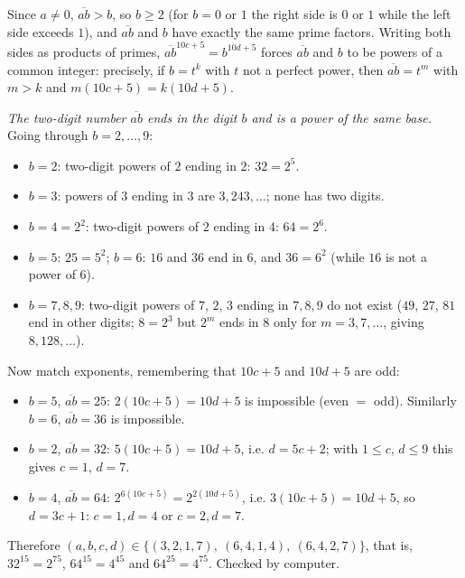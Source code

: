 Since $a\ne0$, $\overline{ab}>b$, so $b\ge2$ (for $b=0$ or $1$ the right side is $0$ or $1$ while the left side exceeds $1$), and $\overline{ab}$ and $b$ have exactly the same prime factors. Writing both sides as products of primes, $\overline{ab}^{10c+5}=b^{10d+5}$ forces $\overline{ab}$ and $b$ to be powers of a common integer: precisely, if $b=t^k$ with $t$ not a perfect power, then $\overline{ab}=t^m$ with $m>k$ and $m(10c+5)=k(10d+5)$.

\emph{The two-digit number $\overline{ab}$ ends in the digit $b$ and is a power of the same base.} Going through $b=2,\dots,9$:
\begin{itemize}
\item $b=2$: two-digit powers of $2$ ending in $2$: $32=2^5$.
\item $b=3$: powers of $3$ ending in $3$ are $3,243,\dots$; none has two digits.
\item $b=4=2^2$: two-digit powers of $2$ ending in $4$: $64=2^6$.
\item $b=5$: $25=5^2$; $b=6$: $16$ and $36$ end in $6$, and $36=6^2$ (while $16$ is not a power of $6$).
\item $b=7,8,9$: two-digit powers of $7$, $2$, $3$ ending in $7,8,9$ do not exist ($49$, $27$, $81$ end in other digits; $8=2^3$ but $2^m$ ends in $8$ only for $m=3,7,\dots$, giving $8,128,\dots$).
\end{itemize}
Now match exponents, remembering that $10c+5$ and $10d+5$ are odd:
\begin{itemize}
\item $b=5$, $\overline{ab}=25$: $2(10c+5)=10d+5$ is impossible (even $=$ odd). Similarly $b=6$, $\overline{ab}=36$ is impossible.
\item $b=2$, $\overline{ab}=32$: $5(10c+5)=10d+5$, i.e. $d=5c+2$; with $1\le c$, $d\le9$ this gives $c=1$, $d=7$.
\item $b=4$, $\overline{ab}=64$: $2^{6(10c+5)}=2^{2(10d+5)}$, i.e. $3(10c+5)=10d+5$, so $d=3c+1$: $c=1,d=4$ or $c=2,d=7$.
\end{itemize}
Therefore $(a,b,c,d)\in\boxed{\{(3,2,1,7),\ (6,4,1,4),\ (6,4,2,7)\}}$, that is, $32^{15}=2^{75}$, $64^{15}=4^{45}$ and $64^{25}=4^{75}$. Checked by computer.
